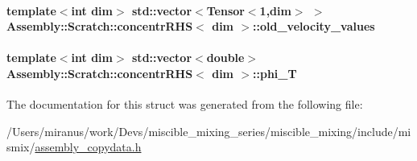 \paragraph[{old\+\_\+velocity\+\_\+values}]{\setlength{\rightskip}{0pt plus 5cm}template$<$int dim$>$ std\+::vector$<$Tensor$<$1,dim$>$ $>$ {\bf Assembly\+::\+Scratch\+::concentr\+R\+H\+S}$<$ dim $>$\+::old\+\_\+velocity\+\_\+values}\label{struct_assembly_1_1_scratch_1_1concentr_r_h_s_a387df4b1d77c791fa36096d021da90b0}
\hypertarget{struct_assembly_1_1_scratch_1_1concentr_r_h_s_acba65db7ab7aece30027901e3b0f030a}{}
\paragraph[{phi\+\_\+\+T}]{\setlength{\rightskip}{0pt plus 5cm}template$<$int dim$>$ std\+::vector$<$double$>$ {\bf Assembly\+::\+Scratch\+::concentr\+R\+H\+S}$<$ dim $>$\+::phi\+\_\+\+T}\label{struct_assembly_1_1_scratch_1_1concentr_r_h_s_acba65db7ab7aece30027901e3b0f030a}


The documentation for this struct was generated from the following file\+:\begin{DoxyCompactItemize}
\item 
/\+Users/miranus/work/\+Devs/miscible\+\_\+mixing\+\_\+series/miscible\+\_\+mixing/include/mismix/\hyperlink{assembly__copydata_8h}{assembly\+\_\+copydata.\+h}\end{DoxyCompactItemize}
